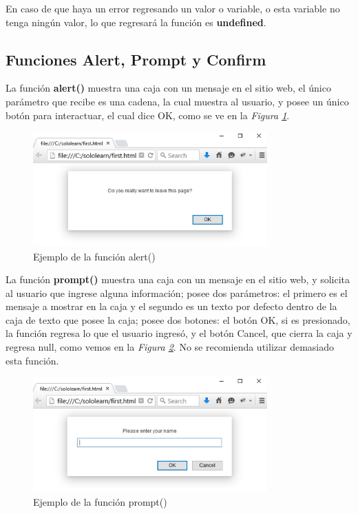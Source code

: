 En caso de que haya un error regresando un valor o variable, o esta variable no tenga ningún valor, lo que regresará la función es \textbf{undefined}.


\subsection{Funciones Alert, Prompt y Confirm}

La función \textbf{alert()} muestra una caja con un mensaje en el sitio web, el único parámetro que recibe es una cadena, la cual muestra al usuario, y posee un único botón para interactuar, el cual dice OK, como se ve en la \textit{Figura \ref{fig: 1}}.
\begin{figure}[H]
    \caption{Ejemplo de la función alert()}
    \label{fig: 1}
    \begin{center}
        \includegraphics [width=9cm]{ss/alert.png}
    \end{center}
\end{figure}

La función \textbf{prompt()} muestra una caja con un mensaje en el sitio web, y solicita al usuario que ingrese alguna información; posee dos parámetros: el primero es el mensaje a mostrar en la caja y el segundo es un texto por defecto dentro de la caja de texto que posee la caja; posee dos botones: el botón OK, si es presionado, la función regresa lo que el usuario ingresó, y el botón Cancel, que cierra la caja y regresa null, como vemos en la \textit{Figura \ref{fig: 2}}. No se recomienda utilizar demasiado esta función.
\begin{figure}[H]
    \caption{Ejemplo de la función prompt()}
    \label{fig: 2}
    \begin{center}
        \includegraphics [width=9cm]{ss/prompt.png}
    \end{center}
\end{figure}


